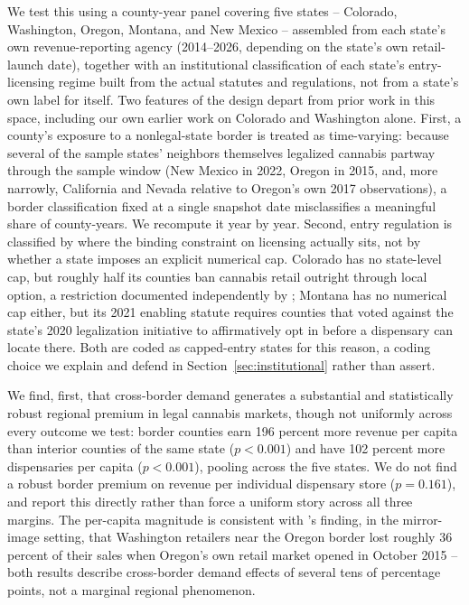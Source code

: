 \documentclass[12pt]{article}
\begin{document}
We test this using a county-year panel covering five states -- Colorado, Washington, Oregon, Montana, and New
Mexico -- assembled from each state's own revenue-reporting agency (2014--2026, depending on the state's own
retail-launch date), together with an institutional classification of each state's entry-licensing regime built
from the actual statutes and regulations, not from a state's own label for itself. Two features of the design
depart from prior work in this space, including our own earlier work on Colorado and Washington alone. First,
a county's exposure to a nonlegal-state border is treated as time-varying: because several of the sample
states' neighbors themselves legalized cannabis partway through the sample window (New Mexico in 2022, Oregon
in 2015, and, more narrowly, California and Nevada relative to Oregon's own 2017 observations), a border
classification fixed at a single snapshot date misclassifies a meaningful share of county-years. We recompute
it year by year. Second, entry regulation is classified by where the binding constraint on licensing actually
sits, not by whether a state imposes an explicit numerical cap. Colorado has no state-level cap, but roughly
half its counties ban cannabis retail outright through local option, a restriction documented independently by
\citet{PayanBrownSong2021}; Montana has no numerical cap either, but its 2021 enabling statute requires
counties that voted against the state's 2020 legalization initiative to affirmatively opt in before a
dispensary can locate there. Both are coded as capped-entry states for this reason, a coding choice we explain
and defend in Section~\ref{sec:institutional} rather than assert.

We find, first, that cross-border demand generates a substantial and statistically robust regional premium in
legal cannabis markets, though not uniformly across every outcome we test: border counties earn 196 percent
more revenue per capita than interior counties of the same state ($p<0.001$) and have 102 percent more
dispensaries per capita ($p<0.001$), pooling across the five states. We do not find a robust border premium on
revenue per individual dispensary store ($p=0.161$), and report this directly rather than force a uniform
story across all three margins. The per-capita magnitude is consistent with \citet{HansenMillerWeber2020}'s
finding, in the mirror-image setting, that Washington retailers near the Oregon border lost roughly 36 percent
of their sales when Oregon's own retail market opened in October 2015 -- both results describe cross-border
demand effects of several tens of percentage points, not a marginal regional phenomenon.
\end{document}
